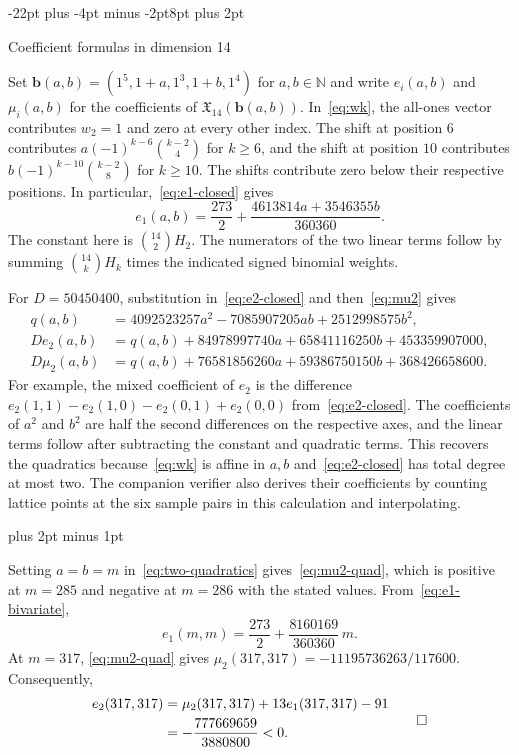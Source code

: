 \documentclass[11pt,letterpaper]{article}
\makeatletter
\renewcommand{\section}{\@startsection{section}{1}{\z@}%
  {-22pt plus -4pt minus -2pt}{8pt plus 2pt}%
  {\normalfont\fontsize{14}{17}\selectfont\bfseries\raggedright}}
\renewenvironment{proof}[1][\proofname]{%
  \par\pushQED{\qed}\normalfont
  \topsep9pt plus 2pt minus 1pt\relax
  \trivlist\item[\hskip\labelsep\itshape #1\@addpunct{.}]\ignorespaces
}{\popQED\endtrivlist\@endpefalse}
\theoremstyle{result}
\theoremstyle{remark}
\newcommand{\NN}{\mathbb{N}}
\newcommand{\X}{\mathfrak{X}}
\newcommand{\vb}{\mathbf{b}}
\makeatother
\begin{document}
\section{Coefficient formulas in dimension 14}
\label{sec:proof}

Set $\vb(a,b)=(1^5,1+a,1^3,1+b,1^4)$ for $a,b\in\NN$ and write $e_i(a,b)$ and $\mu_i(a,b)$ for the coefficients of $\X_{14}(\vb(a,b))$. In~\eqref{eq:wk}, the all-ones vector contributes $w_2=1$ and zero at every other index. The shift at position $6$ contributes $a(-1)^{k-6}\binom{k-2}{4}$ for $k\ge 6$, and the shift at position $10$ contributes $b(-1)^{k-10}\binom{k-2}{8}$ for $k\ge 10$. The shifts contribute zero below their respective positions. In particular,~\eqref{eq:e1-closed} gives
\begin{equation}\label{eq:e1-bivariate}
e_1(a,b)=\frac{273}{2}+\frac{4613814a+3546355b}{360360}.
\end{equation}
The constant here is $\binom{14}{2}H_2$. The numerators of the two linear terms follow by summing $\binom{14}{k}H_k$ times the indicated signed binomial weights.

For $D=50450400$, substitution in~\eqref{eq:e2-closed} and then~\eqref{eq:mu2} gives
\begin{equation}\label{eq:two-quadratics}
\begin{aligned}
q(a,b) &= 4092523257a^2-7085907205ab+2512998575b^2,\\
D e_2(a,b) &= q(a,b)+84978997740a+65841116250b+453359907000,\\
D\mu_2(a,b) &= q(a,b)+76581856260a+59386750150b+368426658600.
\end{aligned}
\end{equation}
For example, the mixed coefficient of $e_2$ is the difference
$e_2(1,1)-e_2(1,0)-e_2(0,1)+e_2(0,0)$ from~\eqref{eq:e2-closed}.
The coefficients of $a^2$ and $b^2$ are half the second differences on the respective axes, and the linear terms follow after subtracting the constant and quadratic terms. This recovers the quadratics because~\eqref{eq:wk} is affine in $a,b$ and~\eqref{eq:e2-closed} has total degree at most two. The companion verifier also derives their coefficients by counting lattice points at the six sample pairs in this calculation and interpolating.

\begin{proof}[Proof of Theorem~\ref{thm:main}]
Setting $a=b=m$ in~\eqref{eq:two-quadratics} gives~\eqref{eq:mu2-quad}, which is positive at $m=285$ and negative at $m=286$ with the stated values. From~\eqref{eq:e1-bivariate},
\begin{equation}\label{eq:e1-diagonal}
e_1(m,m)=\frac{273}{2}+\frac{8160169}{360360}\,m.
\end{equation}
At $m=317$, \eqref{eq:mu2-quad} gives $\mu_2(317,317)=-11195736263/117600$. Consequently,
\[
\begin{aligned}
e_2(317,317) &= \mu_2(317,317)+13e_1(317,317)-91\\
            &= -\frac{777669659}{3880800}<0.
\end{aligned}
\qedhere
\]
\end{proof}
\end{document}
